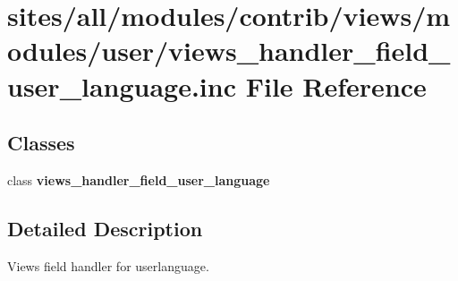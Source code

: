 \hypertarget{views__handler__field__user__language_8inc}{
\section{sites/all/modules/contrib/views/modules/user/views\_\-handler\_\-field\_\-user\_\-language.inc File Reference}
\label{views__handler__field__user__language_8inc}
}
\subsection*{Classes}
\begin{CompactItemize}
\item 
class \textbf{views\_\-handler\_\-field\_\-user\_\-language}
\end{CompactItemize}


\subsection{Detailed Description}
Views field handler for userlanguage. 